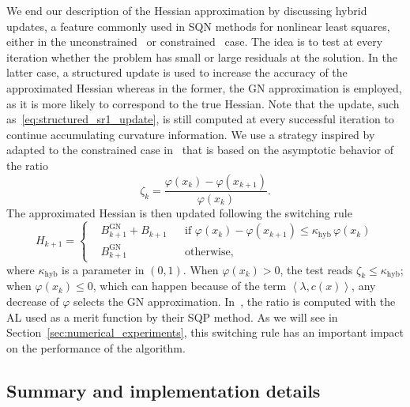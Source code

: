\documentclass[pdflatex,sn-mathphys-num]{sn-jnl}%
\theoremstyle{thmstyleone}%
\newcommand{\inner}[2]{\left\langle {#1} , {#2} \right\rangle} %
\newcommand{\rev}[1]{#1}
\begin{document}
We end our description of the Hessian approximation by discussing hybrid updates, a feature commonly used in SQN methods for nonlinear least squares, either in the unconstrained~\cite{dennisetal:1981,albaalifletcher:1985,fletcherxu:1987} or constrained~\cite{tjoabiegler:1991,li-etal:2002} case. The idea is to test at every iteration whether the problem has small or large residuals at the solution. In the latter case, a structured update is used to increase the accuracy of the approximated Hessian whereas in the former, the GN approximation is employed, as it is more likely to correspond to the true Hessian. Note that the update, such as~\eqref{eq:structured_sr1_update}, is still computed at every successful iteration to continue accumulating curvature information. We use a strategy inspired by~\cite{fletcherxu:1987} adapted to the constrained case in~\cite{tjoabiegler:1991} that is based on the asymptotic behavior of the ratio
\begin{equation*}
	\zeta_k = \dfrac{\varphi(x_{k})-\varphi(x_{k+1})}{\varphi(x_{k})}.
\end{equation*}
The approximated Hessian is then updated following the switching rule
\begin{equation}\label{eq:hybrid_update_strategy}
	H_{k+1} = \left\{\begin{aligned}
		&B^{\mathrm{GN}}_{k+1} + B_{k+1} & &\text{if } \rev{\varphi(x_k)-\varphi(x_{k+1}) \le \kappa_{\mathrm{hyb}}\,\varphi(x_k)} \\
		&B^{\mathrm{GN}}_{k+1}  & & \text{otherwise}, 
	\end{aligned}\right.
\end{equation}
where $\kappa_{\mathrm{hyb}}$ is a parameter in $(0,1)$. \rev{When $\varphi(x_k) > 0$, the test reads $\zeta_k \le \kappa_{\mathrm{hyb}}$; when $\varphi(x_k) \le 0$, which can happen because of the term $\inner{\lambda}{c(x)}$, any decrease of $\varphi$ selects the GN approximation.} In~\cite{tjoabiegler:1991}, the ratio is computed with the AL used as a merit function by their SQP method. As we will see in Section~\ref{sec:numerical_experiments}, this switching rule has an important impact on the performance of the algorithm.

\subsection{Summary and implementation details}\label{subsec:implementation_details}
\end{document}
